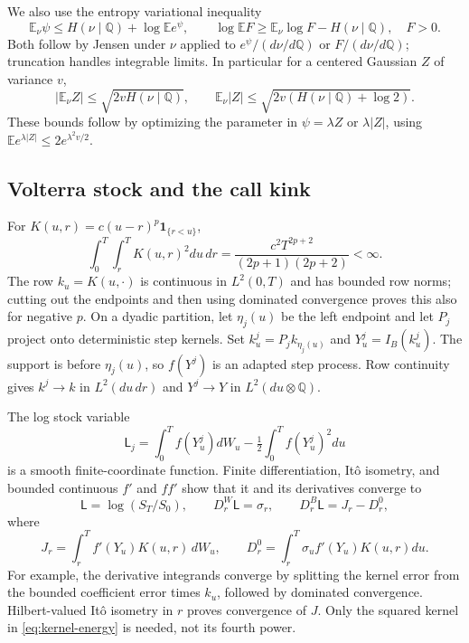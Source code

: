 \documentclass[11pt,a4paper]{amsart}
\theoremstyle{plain}
\theoremstyle{definition}
\theoremstyle{remark}
\newcommand{\EE}{\mathbb{E}}
\newcommand{\QQ}{\mathbb{Q}}
\begin{document}
We also use the entropy variational inequality
\begin{equation}\label{eq:entropy-variational}
 \EE_\nu\psi\le H(\nu\mid\QQ)+\log\EE e^\psi,
 \qquad
 \log\EE F\ge\EE_\nu\log F-H(\nu\mid\QQ),\quad F>0.
\end{equation}
Both follow by Jensen under $\nu$ applied to $e^\psi/(d\nu/d\QQ)$ or $F/(d\nu/d\QQ)$; truncation handles integrable limits. In particular for a centered Gaussian $Z$ of variance $v$,
\begin{equation}\label{eq:entropy-normal}
 |\EE_\nu Z|\le\sqrt{2vH(\nu\mid\QQ)},\qquad
 \EE_\nu|Z|\le\sqrt{2v(H(\nu\mid\QQ)+\log2)}.
\end{equation}
These bounds follow by optimizing the parameter in $\psi=\lambda Z$ or $\lambda|Z|$, using $\EE e^{\lambda|Z|}\le2e^{\lambda^2v/2}$.

\subsection{Volterra stock and the call kink}
For $K(u,r)=c(u-r)^p\mathbf1_{\{r<u\}}$,
\begin{equation}\label{eq:kernel-energy}
 \int_0^T\int_r^T K(u,r)^2du\,dr
 =\frac{c^2T^{2p+2}}{(2p+1)(2p+2)}<\infty.
\end{equation}
The row $k_u=K(u,\cdot)$ is continuous in $L^2(0,T)$ and has bounded row norms; cutting out the endpoints and then using dominated convergence proves this also for negative $p$. On a dyadic partition, let $\eta_j(u)$ be the left endpoint and let $P_j$ project onto deterministic step kernels. Set $k_u^j=P_j k_{\eta_j(u)}$ and $Y_u^j=I_B(k_u^j)$. The support is before $\eta_j(u)$, so $f(Y^j)$ is an adapted step process. Row continuity gives $k^j\to k$ in $L^2(du\,dr)$ and $Y^j\to Y$ in $L^2(du\otimes\QQ)$.

The log stock variable
\[
 \mathsf L_j=\int_0^Tf(Y_u^j)dW_u-\tfrac12\int_0^Tf(Y_u^j)^2du
\]
is a smooth finite-coordinate function. Finite differentiation, It\^o isometry, and bounded continuous $f'$ and $ff'$ show that it and its derivatives converge to
\begin{equation}\label{eq:log-derivative}
 \mathsf L=\log(S_T/S_0),\qquad
 D_r^W\mathsf L=\sigma_r,\qquad
 D_r^B\mathsf L=J_r-D_r^0,
\end{equation}
where
\[
 J_r=\int_r^Tf'(Y_u)K(u,r)\,dW_u,
 \qquad D_r^0=\int_r^T\sigma_uf'(Y_u)K(u,r)du.
\]
For example, the derivative integrands converge by splitting the kernel error from the bounded coefficient error times $k_u$, followed by dominated convergence. Hilbert-valued It\^o isometry in $r$ proves convergence of $J$. Only the squared kernel in \eqref{eq:kernel-energy} is needed, not its fourth power.
\end{document}
